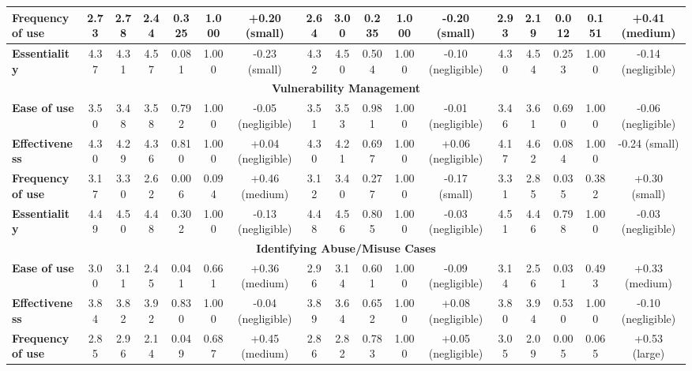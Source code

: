 \begin{tiny}
\begin{longtable}{@{}lcccccccccccccccc@{}}
\textbf{Frequency of use} & 2.73 & 2.78 & 2.44 & 0.325 & 1.000 & \multicolumn{1}{c|}{+0.20 (small)} & 2.64 & 3.00 & 0.235 & 1.000 & \multicolumn{1}{c|}{-0.20 (small)} & 2.93 & 2.19 & 0.012 & 0.151 & +0.41 (medium) \\ \midrule
\textbf{Essentiality} & 4.37 & 4.31 & 4.57 & 0.081 & 1.000 & \multicolumn{1}{c|}{-0.23 (small)} & 4.32 & 4.50 & 0.504 & 1.000 & \multicolumn{1}{c|}{-0.10 (negligible)} & 4.30 & 4.54 & 0.253 & 1.000 & -0.14 (negligible) \\ \midrule
\multicolumn{17}{c}{\textbf{Vulnerability Management}} \\ \midrule
\textbf{Ease of use} & 3.50 & 3.48 & 3.58 & 0.792 & 1.000 & \multicolumn{1}{c|}{-0.05 (negligible)} & 3.51 & 3.53 & 0.981 & 1.000 & \multicolumn{1}{c|}{-0.01 (negligible)} & 3.46 & 3.61 & 0.690 & 1.000 & -0.06 (negligible) \\ \midrule
\textbf{Effectiveness} & 4.30 & 4.29 & 4.36 & 0.810 & 1.000 & \multicolumn{1}{c|}{+0.04 (negligible)} & 4.30 & 4.21 & 0.697 & 1.000 & \multicolumn{1}{c|}{+0.06 (negligible)} & 4.17 & 4.62 & 0.084 & 1.000 & -0.24 (small) \\ \midrule
\textbf{Frequency of use} & 3.17 & 3.30 & 2.62 & 0.006 & 0.094 & \multicolumn{1}{c|}{+0.46 (medium)} & 3.12 & 3.40 & 0.277 & 1.000 & \multicolumn{1}{c|}{-0.17 (small)} & 3.31 & 2.85 & 0.035 & 0.382 & +0.30 (small) \\ \midrule
\textbf{Essentiality} & 4.49 & 4.50 & 4.48 & 0.302 & 1.000 & \multicolumn{1}{c|}{-0.13 (negligible)} & 4.48 & 4.56 & 0.805 & 1.000 & \multicolumn{1}{c|}{-0.03 (negligible)} & 4.51 & 4.46 & 0.798 & 1.000 & -0.03 (negligible) \\ \midrule
\multicolumn{17}{c}{\textbf{Identifying Abuse/Misuse Cases}} \\ \midrule
\textbf{Ease of use} & 3.00 & 3.11 & 2.45 & 0.041 & 0.661 & \multicolumn{1}{c|}{+0.36 (medium)} & 2.96 & 3.14 & 0.601 & 1.000 & \multicolumn{1}{c|}{-0.09 (negligible)} & 3.14 & 2.56 & 0.031 & 0.493 & +0.33 (medium) \\ \midrule
\textbf{Effectiveness} & 3.84 & 3.82 & 3.92 & 0.830 & 1.000 & \multicolumn{1}{c|}{-0.04 (negligible)} & 3.89 & 3.64 & 0.652 & 1.000 & \multicolumn{1}{c|}{+0.08 (negligible)} & 3.80 & 3.94 & 0.530 & 1.000 & -0.10 (negligible) \\ \midrule
\textbf{Frequency of use} & 2.85 & 2.96 & 2.14 & 0.049 & 0.687 & \multicolumn{1}{c|}{+0.45 (medium)} & 2.86 & 2.82 & 0.783 & 1.000 & \multicolumn{1}{c|}{+0.05 (negligible)} & 3.05 & 2.09 & 0.005 & 0.065 & +0.53 (large) \\ \midrule

\end{longtable}
\end{tiny}
